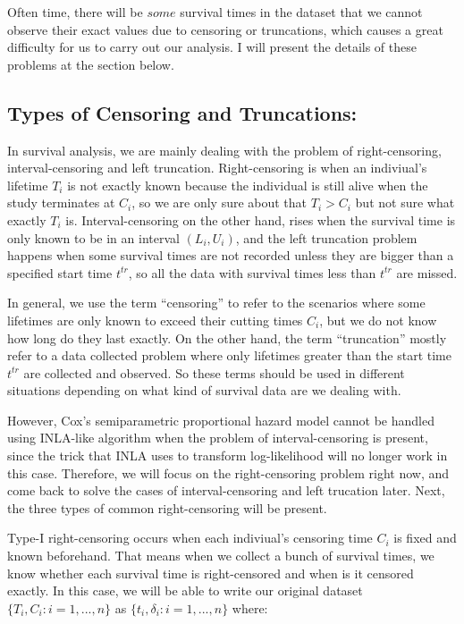 \documentclass[]{article}
\begin{document}
Often time, there will be \(some\) survival times in the dataset that we
cannot observe their exact values due to censoring or truncations, which
causes a great difficulty for us to carry out our analysis. I will
present the details of these problems at the section below.

\hypertarget{types-of-censoring-and-truncations}{%
\subsection{Types of Censoring and
Truncations:}\label{types-of-censoring-and-truncations}}

In survival analysis, we are mainly dealing with the problem of
right-censoring, interval-censoring and left truncation. Right-censoring
is when an indiviual's lifetime \(T_i\) is not exactly known because the
individual is still alive when the study terminates at \(C_i\), so we
are only sure about that \(T_i > C_i\) but not sure what exactly \(T_i\)
is. Interval-censoring on the other hand, rises when the survival time
is only known to be in an interval \((L_i,U_i)\), and the left
truncation problem happens when some survival times are not recorded
unless they are bigger than a specified start time \(t^{tr}\), so all
the data with survival times less than \(t^{tr}\) are missed.

In general, we use the term ``censoring'' to refer to the scenarios
where some lifetimes are only known to exceed their cutting times
\(C_i\), but we do not know how long do they last exactly. On the other
hand, the term ``truncation'' mostly refer to a data collected problem
where only lifetimes greater than the start time \(t^{tr}\) are
collected and observed. So these terms should be used in different
situations depending on what kind of survival data are we dealing with.

However, Cox's semiparametric proportional hazard model cannot be
handled using INLA-like algorithm when the problem of interval-censoring
is present, since the trick that INLA uses to transform log-likelihood
will no longer work in this case. Therefore, we will focus on the
right-censoring problem right now, and come back to solve the cases of
interval-censoring and left trucation later. Next, the three types of
common right-censoring will be present.

Type-I right-censoring occurs when each indiviual's censoring time
\(C_i\) is fixed and known beforehand. That means when we collect a
bunch of survival times, we know whether each survival time is
right-censored and when is it censored exactly. In this case, we will be
able to write our original dataset \(\{ T_i,C_i:i=1,...,n \}\) as
\(\{ t_i,\delta_i:i=1,...,n \}\) where:
\end{document}
